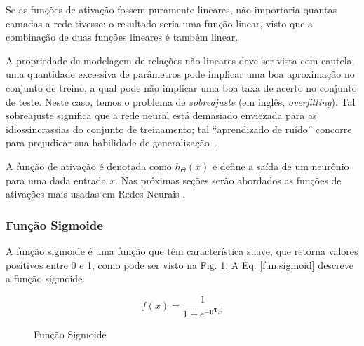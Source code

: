 Se as funções de ativação fossem puramente lineares, não importaria quantas camadas a rede tivesse: o resultado seria uma função linear, visto que a combinação de duas funções lineares é também linear. 

A propriedade de modelagem de relações não lineares deve ser vista com cautela; uma quantidade excessiva de parâmetros pode implicar uma boa aproximação no conjunto de treino, a qual pode não implicar uma boa taxa de acerto no conjunto de teste. Neste caso, temos o problema de \textit{sobreajuste} (em inglês, \textit{overfitting}). Tal sobreajuste significa que a rede neural está demasiado enviezada para as idiossincrassias do conjunto de treinamento; tal ``aprendizado de ruído'' concorre para prejudicar sua habilidade de generalização~\cite{activationfun, haykin2004comprehensive, haykin2009neural, lecun2015deep}.


A função de ativação é denotada como $h_\Theta (x)$ e define a saída de um neurônio para uma dada entrada $x$. Nas próximas seções serão abordados as funções de ativações mais usadas em Redes Neurais \cite{activationfun, haykin2004comprehensive, haykin2009neural, lecun2015deep}.

\subsubsection{Função Sigmoide}
\label{subsec:sigmoid}

A função sigmoide é uma função que têm característica suave, que retorna valores positivos entre 0 e 1, como pode ser visto na  Fig. \ref{fg:funcao_sigmoide}. A Eq. \eqref{fun:sigmoid} descreve a função sigmoide.


\begin{equation}
  f(x) =  \frac{\mathrm{1} }{\mathrm{1} + e^{- \mathbf{\theta^T}x}}
  \label{fun:sigmoid}
\end{equation}

\begin{center}
    \begin{figure}
     \caption{Função Sigmoide}
        \centering
   \label{fg:funcao_sigmoide}
	\end{figure}
\end{center}

